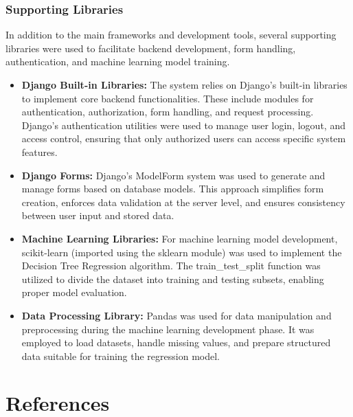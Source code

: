\documentclass[12pt,oneside]{report}
\begin{document}
\subsection{Supporting Libraries}
In addition to the main frameworks and development tools, several supporting libraries were used to facilitate backend development, form handling, authentication, and machine learning model training.

\begin{itemize}[leftmargin=*, itemsep=3pt]
    \item \textbf{Django Built-in Libraries:} The system relies  on Django’s built-in libraries to implement core backend functionalities. These include modules for authentication, authorization, form handling, and request processing. Django’s authentication utilities were used to manage user login, logout, and access control, ensuring that only authorized users can access specific system features.

    \item \textbf{Django Forms:} Django’s ModelForm system was used to generate and manage forms based on database models. This approach simplifies form creation, enforces data validation at the server level, and ensures consistency between user input and stored data. 

    \item \textbf{Machine Learning Libraries:} For machine learning model development, scikit-learn (imported using the sklearn module) was used to implement the Decision Tree Regression algorithm. The train\_test\_split function was utilized to divide the dataset into training and testing subsets, enabling proper model evaluation.

    \item \textbf{Data Processing Library:} Pandas was used for data manipulation and preprocessing during the machine learning development phase. It was employed to load datasets, handle missing values, and prepare structured data suitable for training the regression model.


\end{itemize}



\chapter*{References}
\end{document}
